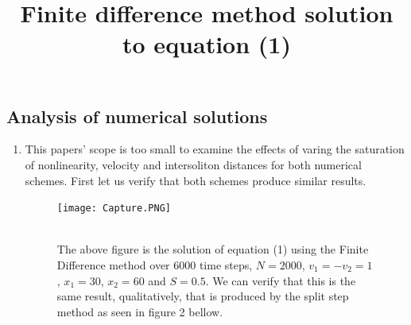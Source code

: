 \documentclass{article}
\begin{document}
\subsection{Analysis of numerical solutions}
\begin{enumerate}
\item

This papers' scope is too small to examine the effects of varing the saturation of nonlinearity, velocity and intersoliton distances for both numerical schemes. First let us verify that both schemes produce similar results.

\begin{figure}[htp]

\title{Finite difference method solution to equation (1)\\}
\centering
\texttt{[image: Capture.PNG]}
\caption{\\The above figure is the solution of equation (1) using the Finite Difference method over 6000 time steps, $N = 2000$, $v_1=-v_2= 1$, $x_1=30$, $x_2=60$ and $S=0.5$. We can verify that this is the same result, qualitatively, that is produced by the split step method as seen in figure 2 bellow. }
\end{figure}



\end{enumerate}
\end{document}
